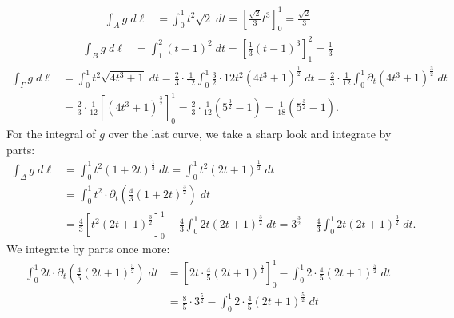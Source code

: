 \documentclass[11pt]{article}
\begin{document}
\begin{solution}
    \begin{align*}
        \int_A g \;d\ell
        &= \int_0^1 t^2\sqrt{2} \;dt = \left[\frac{\sqrt{2}}{3}t^3 \right]_0^1 = \frac{\sqrt{2}}{3}
    \end{align*}
    \begin{align*}
        \int_B g \;d\ell
        &=\int_1^2 (t-1)^2 \;dt = \left[\frac{1}{3} (t-1)^3\right]_1^2 = \frac{1}{3}
    \end{align*}
    \begin{align*}
        \int_\Gamma g \;d\ell
        &=
        \int_0^1 t^2 \sqrt{ 4t^3 + 1 } \;dt
        =
        \frac 2 3 \cdot \frac 1 {12} \int_0^1 \frac 3 2 \cdot 12 t^2 \left( 4t^3 + 1 \right)^{\frac 1 2} \;dt
        =
        \frac 2 3 \cdot \frac 1 {12} \int_0^1 \partial_t \left( 4t^3 + 1 \right)^{\frac 3 2} \;dt
        \\&=
        \frac 2 3 \cdot \frac 1 {12} \left[ \left( 4t^3 + 1 \right)^{\frac 3 2} \right]_0^1
        =
        \frac 2 3 \cdot \frac 1 {12} \left( 5^{\frac 3 2} - 1 \right)
        =
        \frac 1 {18} \left( 5^{\frac 3 2} - 1 \right)
        .
    \end{align*}
    For the integral of $g$ over the last curve, we take a sharp look and integrate by parts:
    \begin{align*}
        \int_\Delta g \;d\ell
        &=
        \int_0^1 t^2 \left( 1 + 2t \right)^{\frac 1 2} \;dt
        =
        \int_0^1 t^2 \left( 2t + 1 \right)^{\frac 1 2} \;dt
        \\&=
        \int_0^1 t^2 \cdot \partial_t\left( \frac 4 3 \left( 1 + 2t \right)^{\frac 3 2} \right) \;dt
        \\&=
        \frac 4 3 \left[ t^2 \left( 2t + 1 \right)^{\frac 3 2} \right]_0^1
        -
        \frac 4 3 \int_0^1 2t \left( 2t + 1 \right)^{\frac 3 2} \;dt
        =
        3^{\frac 3 2}
        -
        \frac 4 3 \int_0^1 2t \left( 2t + 1 \right)^{\frac 3 2} \;dt
        .
    \end{align*}
    We integrate by parts once more:
    \begin{align*}
        \int_0^1 2t \cdot \partial_t\left( \frac 4 5 \left( 2t + 1 \right)^{\frac 5 2} \right) \;dt
        &=
        \left[ 2t \cdot \frac 4 5 \left( 2t + 1 \right)^{\frac 5 2} \right]_0^1
        -
        \int_0^1 2 \cdot \frac 4 5 \left( 2t + 1 \right)^{\frac 5 2} \;dt
        \\&=
        \frac 8 5 \cdot 3^{\frac 5 2}
        -
        \int_0^1 2 \cdot \frac 4 5 \left( 2t + 1 \right)^{\frac 5 2} \;dt

\end{align*}
\end{solution}
\end{document}
